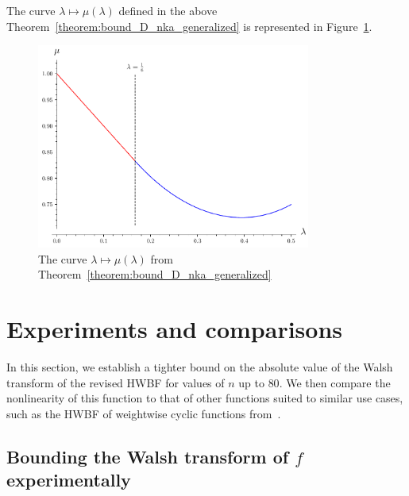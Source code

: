 \documentclass[11pt]{llncs}
\begin{document}
The curve $\lambda\mapsto\mu(\lambda)$ defined in the above Theorem~\ref{theorem:bound_D_nka_generalized} is represented in Figure~\ref{fig:curve_exponents_lambda_mu}.

\begin{figure}
	\centering
	\includegraphics[width=9cm]{curve_exponents_lambda_mu.pdf}
	\caption{The curve $\lambda\mapsto\mu(\lambda)$ from Theorem~\ref{theorem:bound_D_nka_generalized}}
	\label{fig:curve_exponents_lambda_mu}
\end{figure}



\section{Experiments and comparisons}

In this section, we establish a tighter bound on the absolute value of the Walsh transform of the revised HWBF for values of $n$ up to $80$. 
We then compare the nonlinearity of this function to that of other functions suited to similar use cases, such as the HWBF of weightwise cyclic functions from~\cite{DAM:MeaOza24}.

\subsection{Bounding the Walsh transform of $f$ experimentally}\label{sec:expwt}

\end{document}
